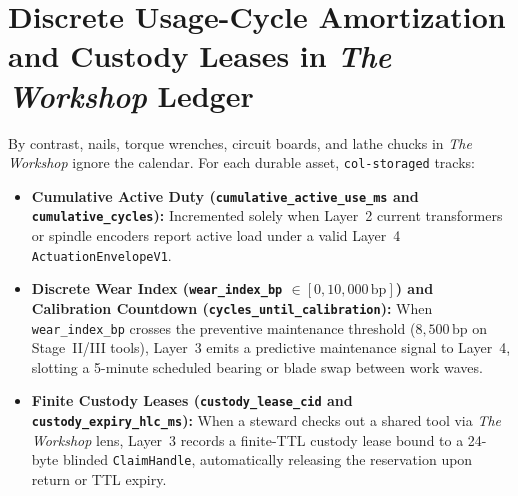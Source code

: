 \section{Discrete Usage-Cycle Amortization and Custody Leases in \textit{The Workshop} Ledger}
\label{sec:ch7-workshop-ledger}

By contrast, nails, torque wrenches, circuit boards, and lathe chucks in \textit{The Workshop} ignore the calendar. For each durable asset, \texttt{col-storaged} tracks:
\begin{itemize}
    \item \textbf{Cumulative Active Duty (\texttt{cumulative\_active\_use\_ms} and \texttt{cumulative\_cycles}):} Incremented solely when Layer~2 current transformers or spindle encoders report active load under a valid Layer~4 \texttt{ActuationEnvelopeV1}.
    \item \textbf{Discrete Wear Index (\texttt{wear\_index\_bp} $\in [0, 10{,}000\,\mathrm{bp}]$) and Calibration Countdown (\texttt{cycles\_until\_calibration}):} When \texttt{wear\_index\_bp} crosses the preventive maintenance threshold ($8{,}500\,\mathrm{bp}$ on Stage~II/III tools), Layer~3 emits a predictive maintenance signal to Layer~4, slotting a 5-minute scheduled bearing or blade swap between work waves.
    \item \textbf{Finite Custody Leases (\texttt{custody\_lease\_cid} and \texttt{custody\_expiry\_hlc\_ms}):} When a steward checks out a shared tool via \textit{The Workshop} lens, Layer~3 records a finite-TTL custody lease bound to a 24-byte blinded \texttt{ClaimHandle}, automatically releasing the reservation upon return or TTL expiry.
\end{itemize}

